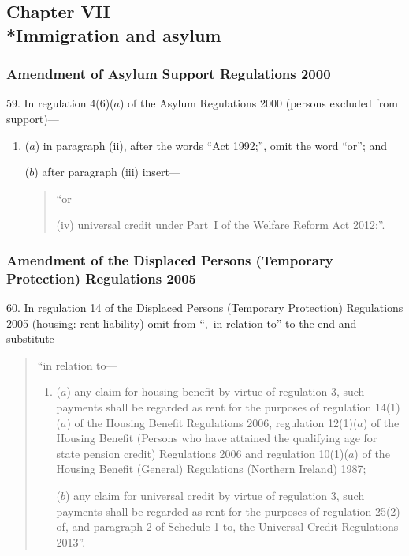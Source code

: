 \documentclass[12pt,a4paper]{article}
\begin{document}
\subsection[Chapter VII --- Immigration and asylum]{Chapter VII\\*Immigration and asylum}

\renewcommand\parthead{--- Part III Chapter VII}

\subsubsection[59. Amendment of Asylum Support Regulations 2000]{Amendment of Asylum Support Regulations 2000}

59.  In regulation 4(6)($a$)  of the Asylum Regulations 2000 (persons excluded from support)—
\begin{enumerate}\item[]
($a$) in paragraph (ii), after the words “Act 1992;”, omit the word “or”; and

($b$) after paragraph (iii)  insert—
\begin{quotation}
“or

(iv) universal credit under Part~I of the Welfare Reform Act 2012;”.
\end{quotation}
\end{enumerate}

\subsubsection[60. Amendment of the Displaced Persons (Temporary Protection) Regulations 2005]{Amendment of the Displaced Persons (Temporary Protection) Regulations 2005}

60.  In regulation 14 of the Displaced Persons (Temporary Protection) Regulations 2005 (housing: rent liability) omit from “,~in relation to” to the end and substitute—
\begin{quotation}
“in relation to—
\begin{enumerate}\item[]
($a$) any claim for housing benefit by virtue of regulation 3, such payments shall be regarded as rent for the purposes of regulation 14(1)($a$)  of the Housing Benefit Regulations 2006, regulation 12(1)($a$)  of the Housing Benefit (Persons who have attained the qualifying age for state pension credit) Regulations 2006 and regulation 10(1)($a$)  of the Housing Benefit (General) Regulations (Northern Ireland) 1987;

($b$) any claim for universal credit by virtue of regulation 3, such payments shall be regarded as rent for the purposes of regulation 25(2) of, and paragraph 2 of Schedule 1 to, the Universal Credit Regulations 2013”.
\end{enumerate}
\end{quotation}
\end{document}
